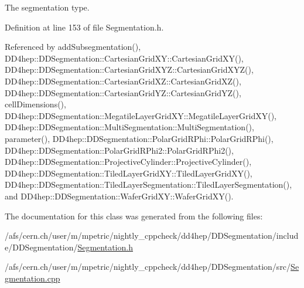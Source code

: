 The segmentation type. 



Definition at line 153 of file Segmentation.\+h.



Referenced by add\+Subsegmentation(), D\+D4hep\+::\+D\+D\+Segmentation\+::\+Cartesian\+Grid\+X\+Y\+::\+Cartesian\+Grid\+X\+Y(), D\+D4hep\+::\+D\+D\+Segmentation\+::\+Cartesian\+Grid\+X\+Y\+Z\+::\+Cartesian\+Grid\+X\+Y\+Z(), D\+D4hep\+::\+D\+D\+Segmentation\+::\+Cartesian\+Grid\+X\+Z\+::\+Cartesian\+Grid\+X\+Z(), D\+D4hep\+::\+D\+D\+Segmentation\+::\+Cartesian\+Grid\+Y\+Z\+::\+Cartesian\+Grid\+Y\+Z(), cell\+Dimensions(), D\+D4hep\+::\+D\+D\+Segmentation\+::\+Megatile\+Layer\+Grid\+X\+Y\+::\+Megatile\+Layer\+Grid\+X\+Y(), D\+D4hep\+::\+D\+D\+Segmentation\+::\+Multi\+Segmentation\+::\+Multi\+Segmentation(), parameter(), D\+D4hep\+::\+D\+D\+Segmentation\+::\+Polar\+Grid\+R\+Phi\+::\+Polar\+Grid\+R\+Phi(), D\+D4hep\+::\+D\+D\+Segmentation\+::\+Polar\+Grid\+R\+Phi2\+::\+Polar\+Grid\+R\+Phi2(), D\+D4hep\+::\+D\+D\+Segmentation\+::\+Projective\+Cylinder\+::\+Projective\+Cylinder(), D\+D4hep\+::\+D\+D\+Segmentation\+::\+Tiled\+Layer\+Grid\+X\+Y\+::\+Tiled\+Layer\+Grid\+X\+Y(), D\+D4hep\+::\+D\+D\+Segmentation\+::\+Tiled\+Layer\+Segmentation\+::\+Tiled\+Layer\+Segmentation(), and D\+D4hep\+::\+D\+D\+Segmentation\+::\+Wafer\+Grid\+X\+Y\+::\+Wafer\+Grid\+X\+Y().



The documentation for this class was generated from the following files\+:\begin{DoxyCompactItemize}
\item 
/afs/cern.\+ch/user/m/mpetric/nightly\+\_\+cppcheck/dd4hep/\+D\+D\+Segmentation/include/\+D\+D\+Segmentation/\hyperlink{_segmentation_8h}{Segmentation.\+h}\item 
/afs/cern.\+ch/user/m/mpetric/nightly\+\_\+cppcheck/dd4hep/\+D\+D\+Segmentation/src/\hyperlink{_segmentation_8cpp}{Segmentation.\+cpp}\end{DoxyCompactItemize}
